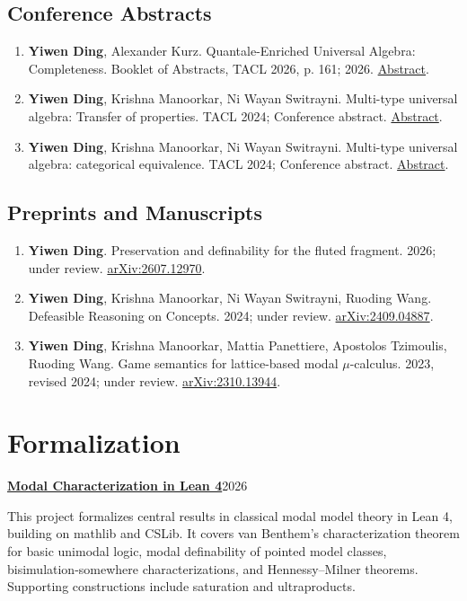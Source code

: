 \documentclass[11pt,a4paper]{article}
\begin{document}
\subsection*{Conference Abstracts}
\begin{enumerate}
\item \textbf{Yiwen Ding}, Alexander Kurz. Quantale-Enriched Universal Algebra: Completeness. \textnormal{Booklet of Abstracts, TACL 2026, p. 161; 2026}. \href{https://iris.unipa.it/retrieve/c1d30036-c6f7-4315-8974-d4cc712c6552/TACL\%202026\%20-\%20Booklet\%20of\%20Abstracts.pdf\#page=176}{Abstract}.
\item \textbf{Yiwen Ding}, Krishna Manoorkar, Ni Wayan Switrayni. Multi-type universal algebra: Transfer of properties. \textnormal{TACL 2024; Conference abstract}. \href{https://iiia.csic.es/tacl2024/abstracts/conference/contributed/TACL_2024_paper_72.pdf}{Abstract}.
\item \textbf{Yiwen Ding}, Krishna Manoorkar, Ni Wayan Switrayni. Multi-type universal algebra: categorical equivalence. \textnormal{TACL 2024; Conference abstract}. \href{https://iiia.csic.es/tacl2024/abstracts/conference/contributed/TACL_2024_paper_75.pdf}{Abstract}.
\end{enumerate}
\subsection*{Preprints and Manuscripts}
\begin{enumerate}
\item \textbf{Yiwen Ding}. Preservation and definability for the fluted fragment. \textnormal{2026; under review}. \href{https://arxiv.org/abs/2607.12970}{arXiv:2607.12970}.
\item \textbf{Yiwen Ding}, Krishna Manoorkar, Ni Wayan Switrayni, Ruoding Wang. Defeasible Reasoning on Concepts. \textnormal{2024; under review}. \href{https://arxiv.org/abs/2409.04887}{arXiv:2409.04887}.
\item \textbf{Yiwen Ding}, Krishna Manoorkar, Mattia Panettiere, Apostolos Tzimoulis, Ruoding Wang. Game semantics for lattice-based modal $\mu$-calculus. \textnormal{2023, revised 2024; under review}. \href{https://arxiv.org/abs/2310.13944}{arXiv:2310.13944}.
\end{enumerate}

\section*{Formalization}
\textbf{\href{https://github.com/YiwenDing-Logic/modal-characterization-in-lean4}{Modal Characterization in Lean 4}}\hfill 2026\par
This project formalizes central results in classical modal model theory in Lean 4, building on mathlib and CSLib. It covers van Benthem's characterization theorem for basic unimodal logic, modal definability of pointed model classes, bisimulation-somewhere characterizations, and Hennessy--Milner theorems. Supporting constructions include saturation and ultraproducts.
\end{document}
